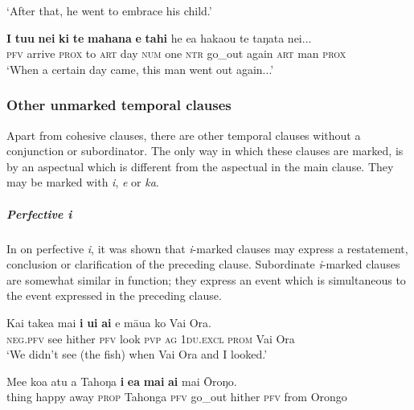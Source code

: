 \glt 
‘After that, he went to embrace his child.’ \textstyleExampleref{[R210.068]} 
\z

\ea\label{ex:11.221}
\gll \textbf{I} \textbf{tu{\ꞌ}u} \textbf{nei} \textbf{ki} \textbf{te} \textbf{mahana} \textbf{e} \textbf{tahi} he e{\ꞌ}a haka{\ꞌ}ou te taŋata nei... \\
\textsc{pfv} arrive \textsc{prox} to \textsc{art} day \textsc{num} one \textsc{ntr} go\_out again \textsc{art} man \textsc{prox} \\

\glt 
‘When a certain day came, this man went out again...’ \textstyleExampleref{[R310.025]}\textstyleExampleref{} 
\z
{}

\subsubsection[Other unmarked temporal clauses ]{Other unmarked temporal clauses} \label{sec:11.6.2.2}
Apart from cohesive clauses, there are other temporal clauses without a conjunction or subordinator. The only way in which these clauses are marked, is by an aspectual which is different from the aspectual in the main clause. They may be marked with \textit{i}, \textit{e} or \textit{ka}.

\subparagraph{Perfective \textit{i}} In  on perfective \textit{i}, it was shown that \textit{i}{}-marked clauses may express a restatement, conclusion or clarification of the preceding clause. Subordinate \textit{i}{}-marked clauses are somewhat similar in function; they express an event which is simultaneous to the event expressed in the preceding clause. 

\ea\label{ex:11.222}
\gll Kai take{\ꞌ}a mai \textbf{i} \textbf{u{\ꞌ}i} \textbf{ai} e māua ko Vai Ora. \\
\textsc{neg.pfv} see hither \textsc{pfv} look \textsc{pvp} \textsc{ag} \textsc{1du.excl} \textsc{prom} Vai Ora \\

\glt 
‘We didn’t see (the fish) when Vai Ora and I looked.’ \textstyleExampleref{[R301.292]} 
\z

\ea\label{ex:11.223}
\gll Me{\ꞌ}e koa atu a Tahoŋa \textbf{i} \textbf{e{\ꞌ}a} \textbf{mai} \textbf{ai} mai {\ꞌ}Ōroŋo. \\
thing happy away \textsc{prop} Tahonga \textsc{pfv} go\_out hither \textsc{pfv} from Orongo \\

